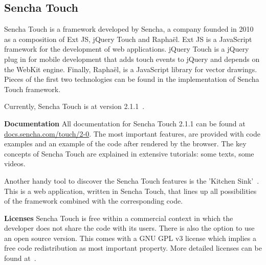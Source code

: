 \documentclass[a4paper]{artikel3}
\renewcommand{\url}[1]{\href{http://#1}{#1}}
\renewcommand{\paragraph}[1]{{\bf #1} }
\begin{document}
\subsection{Sencha Touch} %
\label{sec:sencha_touch}

Sencha Touch is a framework developed by Sencha,  a company founded in 2010 as a composition of Ext JS, jQuery Touch and Raphaël.  Ext JS is a JavaScript framework for the development of web applications.  jQuery Touch is a jQuery plug in for mobile development that adds touch events to jQuery and depends on the WebKit engine.  Finally,  Raphaël, is a JavaScript library for vector drawings.  Pieces of the first two technologies can be found in the implementation of Sencha Touch framework.    

Currently,  Sencha Touch is at version 2.1.1~\cite{Inc.}.

\paragraph{Documentation}
All documentation for Sencha Touch 2.1.1 can be found at \url{docs.sencha.com/touch/2-0}.  The most important features,  are provided with code examples and an example of the code after rendered by the browser.  The key concepts of Sencha Touch are explained in extensive tutorials:  some texts, some videos.  

Another handy tool to discover the Sencha Touch features is the 'Kitchen Sink'~\cite{Inc.2013}.  This is a web application,  written in Sencha Touch,  that lines up all possibilities of the framework combined with the corresponding code.


\paragraph{Licenses}
Sencha Touch is free within a commercial context in which the developer does not share the code with its users.  There is also the option to use an open source version.  This comes with a GNU GPL v3 license which implies a free code redistribution as most important property.
More detailed licenses can be found at~\cite{SenchaInc.}.
  
\end{document}
